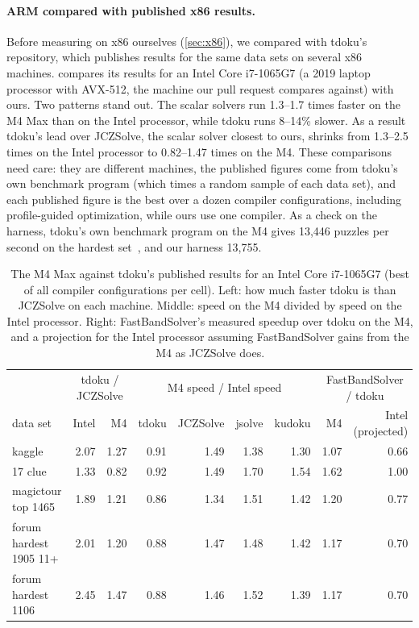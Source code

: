\documentclass[11pt]{article}
\theoremstyle{definition}
\theoremstyle{plain}
\begin{document}
\paragraph{ARM compared with published x86 results.} Before measuring on x86 ourselves (\cref{sec:x86}), we
compared with tdoku's repository, which publishes results for the same data sets on several x86 machines.  compares its results for
an Intel Core i7-1065G7 (a 2019 laptop processor with AVX-512, the machine our pull request compares against)
with ours. Two patterns stand out. The scalar solvers run 1.3--1.7 times faster on the M4 Max than on the Intel
processor, while tdoku runs 8--14\% slower. As a result tdoku's lead over JCZSolve, the scalar solver closest to ours,
shrinks from 1.3--2.5 times on the Intel processor to 0.82--1.47 times on the M4. These comparisons need care: they
are different machines, the published figures come from tdoku's own benchmark program (which times a random sample of
each data set), and each published figure is the best over a dozen compiler configurations, including profile-guided
optimization, while ours use one compiler. As a check on the harness, tdoku's own benchmark program on the M4 gives
13{,}446 puzzles per second on the hardest set~\cite{kelly2026tdokuarm}, and our harness 13{,}755.

\begin{table}[t]
\centering
\caption{The M4 Max against tdoku's published results for an Intel Core i7-1065G7 (best of all compiler configurations
per cell). Left: how much faster tdoku is than JCZSolve on each machine. Middle: speed on the M4 divided by speed on the
Intel processor. Right: FastBandSolver's measured speedup over tdoku on the M4, and a projection for the Intel
processor assuming FastBandSolver gains from the M4 as JCZSolve does.}
\label{tab:published}
\small
\setlength{\tabcolsep}{4pt}
\begin{tabular}{lrrrrrrrr}
\toprule
& \multicolumn{2}{c}{tdoku / JCZSolve} & \multicolumn{4}{c}{M4 speed / Intel speed} & \multicolumn{2}{c}{FastBandSolver / tdoku} \\
\cmidrule(lr){2-3} \cmidrule(lr){4-7} \cmidrule(lr){8-9}
data set & Intel & M4 & tdoku & JCZSolve & jsolve & kudoku & M4 & Intel (projected) \\
\midrule
kaggle & 2.07 & 1.27 & 0.91 & 1.49 & 1.38 & 1.30 & 1.07 & 0.66 \\
17 clue & 1.33 & 0.82 & 0.92 & 1.49 & 1.70 & 1.54 & 1.62 & 1.00 \\
magictour top 1465 & 1.89 & 1.21 & 0.86 & 1.34 & 1.51 & 1.42 & 1.20 & 0.77 \\
forum hardest 1905 11+ & 2.01 & 1.20 & 0.88 & 1.47 & 1.48 & 1.42 & 1.17 & 0.70 \\
forum hardest 1106 & 2.45 & 1.47 & 0.88 & 1.46 & 1.52 & 1.39 & 1.17 & 0.70 \\
\bottomrule
\end{tabular}
\end{table}
\end{document}
